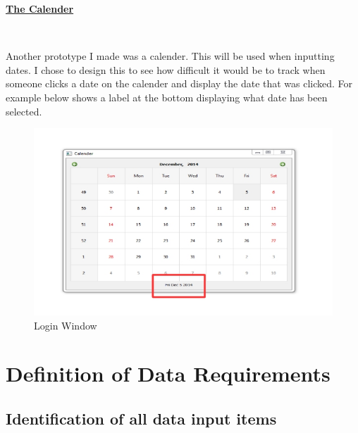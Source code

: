 \newpage

\underline {\textbf{The Calender}}

\

Another prototype I made was a calender. This will be used when inputting dates. I chose to design this to see how difficult it would be to track when someone clicks a date on the calender and display the date that was clicked. For example below shows a label at the bottom displaying what date has been selected.

\begin{figure}[H]
\includegraphics[width=\textwidth]{Calender.jpg}
\caption{Login Window}
\end{figure}


\section{Definition of Data Requirements}

\subsection{Identification of all data input items}

